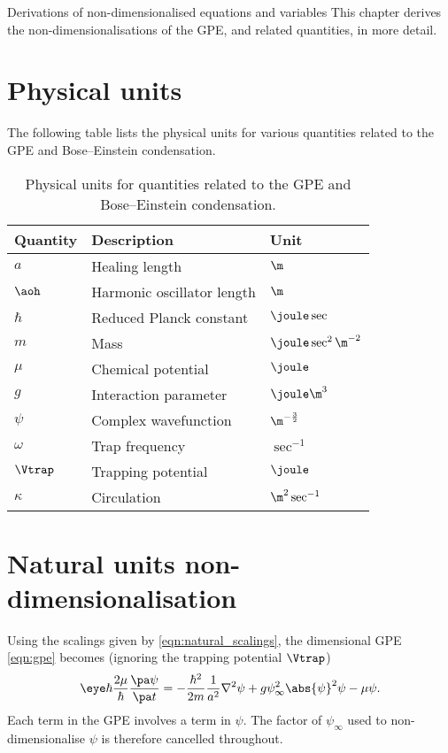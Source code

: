 \begin{chapter}{\label{cha:nondim}Derivations of non-dimensionalised equations
and variables}
  This chapter derives the non-dimensionalisations of the GPE, and related
  quantities, in more detail.

  \section{Physical units}
  The following table lists the physical units for various quantities
  related to the GPE and Bose--Einstein condensation.
  \begin{table}[h]
    \centering
    \begin{tabular}{lll}
      \hline
      Quantity & Description & Unit \\
      \hline
      $a$      & Healing length & $\m$ \\
      $\aoh$   & Harmonic oscillator length & $\m$ \\
      $\hbar$  & Reduced Planck constant & $\joule\sec$ \\
      $m$      & Mass & $\joule\sec^{2}\m^{-2}$ \\
      $\mu$    & Chemical potential & $\joule$ \\
      $g$      & Interaction parameter & $\joule\m^{3}$ \\
      $\psi$   & Complex wavefunction & $\m^{-\frac{3}{2}}$ \\
      $\omega$ & Trap frequency & $\sec^{-1}$ \\
      $\Vtrap$ & Trapping potential & $\joule$ \\
      $\kappa$ & Circulation & $\m^{2}\sec^{-1}$ \\
      \hline\hline
    \end{tabular}
    \caption{Physical units for quantities related to the GPE and
      Bose--Einstein condensation.}
  \end{table}
  
  \section{Natural units non-dimensionalisation}
  Using the scalings given by \eqref{eqn:natural_scalings}, the dimensional GPE
  \eqref{eqn:gpe} becomes (ignoring the trapping potential $\Vtrap$)
  \begin{equation*}
    \eye \hbar \frac{2\mu}{\hbar} \frac{\pa \psi}{\pa t} =
    -\frac{\hbar^{2}}{2m} \frac{1}{a^{2}} \nabla^{2} \psi + g \psi_{\infty}^{2}
    \abs{\psi}^{2} \psi - \mu \psi.
  \end{equation*}
  Each term in the GPE involves a term in $\psi$.  The factor of
  $\psi_{\infty}$ used to non-dimensionalise $\psi$ is therefore cancelled
  throughout.
  

\end{chapter}
